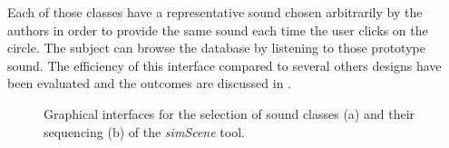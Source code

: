 \documentclass[twoside,twocolumn]{article}
\begin{document}

Each of those classes have a representative sound chosen arbitrarily by the authors in order to provide the same sound each time the user clicks on the circle. The subject can browse the database by listening to those prototype sound. The efficiency of this interface compared to several others designs have been evaluated and the outcomes are discussed in \cite{lafay2016JAES}.

\begin{figure}[t]
        \myfloatalign
         \par
       \caption{Graphical interfaces for the selection of sound classes (a) and their sequencing (b) of the \emph{simScene} tool.}
\end{figure}
\end{document}
